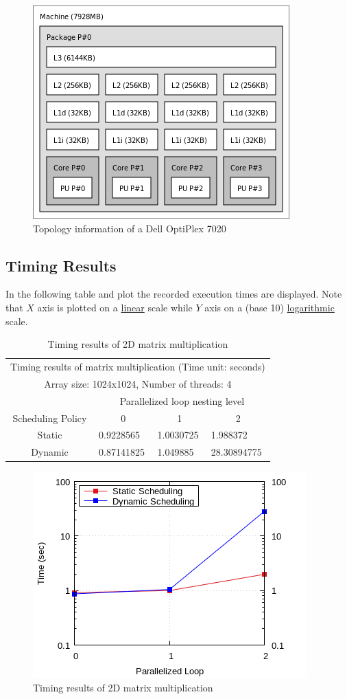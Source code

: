 \documentclass{article}
\begin{document}
\begin{figure}[htbp]
  \centering
  \includegraphics[width=0.5\columnwidth]{./opti7020-topo.png}
  \caption{Topology information of a Dell OptiPlex 7020}
\end{figure}

\pagebreak

\subsection{Timing Results}
In the following table and plot the recorded execution times are displayed.
Note that $X$ axis is plotted on a \underline{linear} scale while $Y$ axis on
a (base 10) \underline{logarithmic} scale.


\begin{table}[htbp]
  \centering
    \begin{tabular}{|c||l|l|l|} 
    \hline
    \multicolumn{4}{|c|}{Timing results of matrix multiplication (Time unit: seconds)} \\
    \multicolumn{4}{|c|}{Array size: 1024x1024, Number of threads: 4} \\
    \hline
    & \multicolumn{3}{|c|}{Parallelized loop nesting level} \\
    \hline
    Scheduling Policy  & \multicolumn{1}{|c|}{0} & \multicolumn{1}{|c|}{1} & \multicolumn{1}{|c|}{2} \\
    \hline\hline
    Static & 0.9228565 & 1.0030725 & 1.988372 \\
    \hline
    Dynamic & 0.87141825 & 1.049885 & 28.30894775 \\
    \hline
    \end{tabular}
  \caption{Timing results of 2D matrix multiplication}
\end{table}


\begin{figure}[htbp]
  \centering
  \includegraphics[width=0.55\columnwidth]{../../hw2/ex1/plots/matmul.png}
  \caption{Timing results of 2D matrix multiplication}
\end{figure}
\end{document}
